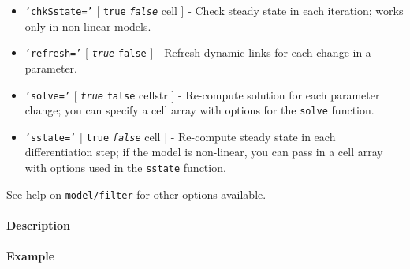 \begin{itemize}
\item
  \texttt{'chkSstate='} {[} \texttt{true} \textbar{}
  \emph{\texttt{false}} \textbar{} cell {]} - Check steady state in each
  iteration; works only in non-linear models.
\item
  \texttt{'refresh='} {[} \emph{\texttt{true}} \textbar{} \texttt{false}
  {]} - Refresh dynamic links for each change in a parameter.
\item
  \texttt{'solve='} {[} \emph{\texttt{true}} \textbar{} \texttt{false}
  \textbar{} cellstr {]} - Re-compute solution for each parameter
  change; you can specify a cell array with options for the
  \texttt{solve} function.
\item
  \texttt{'sstate='} {[} \texttt{true} \textbar{} \emph{\texttt{false}}
  \textbar{} cell {]} - Re-compute steady state in each differentiation
  step; if the model is non-linear, you can pass in a cell array with
  options used in the \texttt{sstate} function.
\end{itemize}

See help on \href{model/filter}{\texttt{model/filter}} for other options
available.

\paragraph{Description}

\paragraph{Example}


